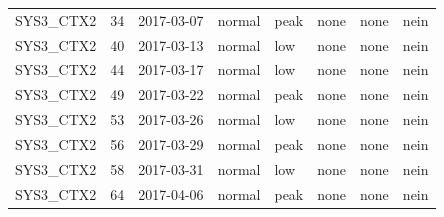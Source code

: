 \begin{tabular}{lrllllll}
SYS3\_CTX2 & 34 & 2017-03-07 & normal & peak & none & none & nein \\
SYS3\_CTX2 & 40 & 2017-03-13 & normal & low & none & none & nein \\
SYS3\_CTX2 & 44 & 2017-03-17 & normal & low & none & none & nein \\
SYS3\_CTX2 & 49 & 2017-03-22 & normal & peak & none & none & nein \\
SYS3\_CTX2 & 53 & 2017-03-26 & normal & low & none & none & nein \\
SYS3\_CTX2 & 56 & 2017-03-29 & normal & peak & none & none & nein \\
SYS3\_CTX2 & 58 & 2017-03-31 & normal & low & none & none & nein \\
SYS3\_CTX2 & 64 & 2017-04-06 & normal & peak & none & none & nein \\
\bottomrule
\end{tabular}
